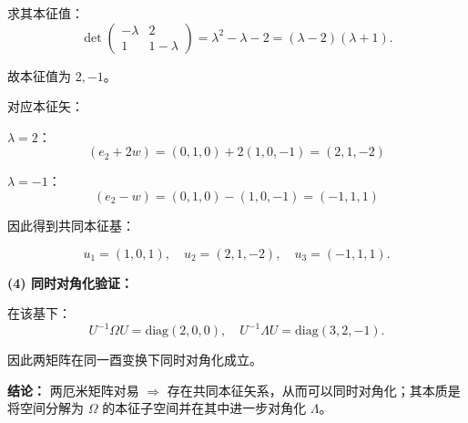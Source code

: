 \begin{solution}
求其本征值：
\[
\det
\begin{pmatrix}
-\lambda&2\\
1&1-\lambda
\end{pmatrix}
=\lambda^2-\lambda-2=(\lambda-2)(\lambda+1).
\]

故本征值为 $2,-1$。

对应本征矢：

$\lambda=2$：
\[
(e_2+2w)=(0,1,0)+2(1,0,-1)=(2,1,-2)
\]

$\lambda=-1$：
\[
(e_2-w)=(0,1,0)-(1,0,-1)=(-1,1,1)
\]

因此得到共同本征基：

\[
u_1=(1,0,1),\quad
u_2=(2,1,-2),\quad
u_3=(-1,1,1).
\]

\vspace{0.5em}
\textbf{(4) 同时对角化验证：}

在该基下：
\[
U^{-1}\Omega U=\mathrm{diag}(2,0,0),
\quad
U^{-1}\Lambda U=\mathrm{diag}(3,2,-1).
\]

因此两矩阵在同一酉变换下同时对角化成立。

\vspace{0.5em}
\textbf{结论：}
两厄米矩阵对易 $\Rightarrow$ 存在共同本征矢系，从而可以同时对角化；其本质是将空间分解为 $\Omega$ 的本征子空间并在其中进一步对角化 $\Lambda$。
\end{solution}


